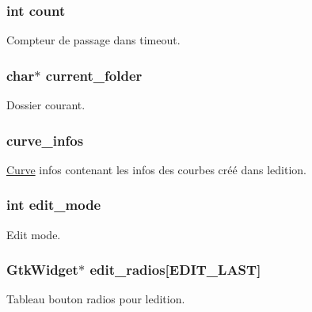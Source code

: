 \subsubsection[{\texorpdfstring{count}{count}}]{\setlength{\rightskip}{0pt plus 5cm}int count}\hypertarget{struct_mydata_ad43c3812e6d13e0518d9f8b8f463ffcf}{}\label{struct_mydata_ad43c3812e6d13e0518d9f8b8f463ffcf}
Compteur de passage dans timeout. 
\subsubsection[{\texorpdfstring{current\+\_\+folder}{current_folder}}]{\setlength{\rightskip}{0pt plus 5cm}char$\ast$ current\+\_\+folder}\hypertarget{struct_mydata_aecf8e6b88573cc04da63f47bfc13a246}{}\label{struct_mydata_aecf8e6b88573cc04da63f47bfc13a246}
Dossier courant. 
\subsubsection[{\texorpdfstring{curve\+\_\+infos}{curve_infos}}]{ curve\+\_\+infos}\hypertarget{struct_mydata_a917c9ea829deeac9d6a1c2309f76595b}{}\label{struct_mydata_a917c9ea829deeac9d6a1c2309f76595b}
\hyperlink{struct_curve}{Curve} infos contenant les infos des courbes créé dans l\textquotesingle{}edition. 
\subsubsection[{\texorpdfstring{edit\+\_\+mode}{edit_mode}}]{\setlength{\rightskip}{0pt plus 5cm}int edit\+\_\+mode}\hypertarget{struct_mydata_a7e53a3b3c1cac6e3afebd783728d232c}{}\label{struct_mydata_a7e53a3b3c1cac6e3afebd783728d232c}
Edit mode. 
\subsubsection[{\texorpdfstring{edit\+\_\+radios}{edit_radios}}]{\setlength{\rightskip}{0pt plus 5cm}Gtk\+Widget$\ast$ edit\+\_\+radios\mbox{[}E\+D\+I\+T\+\_\+\+L\+A\+ST\mbox{]}}\hypertarget{struct_mydata_afeceefa9528b56c22e00612af53c8272}{}\label{struct_mydata_afeceefa9528b56c22e00612af53c8272}
Tableau bouton radios pour l\textquotesingle{}edition. 
